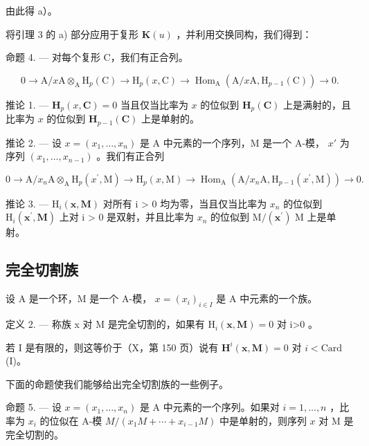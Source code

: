 由此得 a）。

将引理 3 的 a) 部分应用于复形 \(\mathbf{K}(u)\) ，并利用交换同构，我们得到：

命题 4. --- 对每个复形 C，我们有正合列。

\[
0 \rightarrow \mathrm{A} / x \mathrm{A} \otimes_ {\mathrm{A}} \mathrm{H} _ {p} (\mathrm{C}) \rightarrow \mathrm{H} _ {p} (x, \mathrm{C}) \rightarrow \operatorname{Hom} _ {\mathrm{A}} (\mathrm{A} / x \mathrm{A}, \mathrm{H} _ {p - 1} (\mathrm{C})) \rightarrow 0.
\]

推论 1. --- \(\mathbf{H}_{p}(x,\mathbf{C})=0\) 当且仅当比率为 \(x\) 的位似到 \(\mathbf{H}_{p}(\mathbf{C})\) 上是满射的，且比率为 \(x\) 的位似到 \(\mathbf{H}_{p-1}(\mathbf{C})\) 上是单射的。

推论 2. --- 设 \(x = (x_1, \ldots, x_n)\) 是 A 中元素的一个序列，M 是一个 A-模， \(x'\) 为序列 \((x_1, \ldots, x_{n-1})\) 。我们有正合列

\[
0 \rightarrow \mathrm{A} / x _ {n} \mathrm{A} \otimes_ {\mathrm{A}} \mathrm{H} _ {p} (x ^ {\prime}, \mathrm{M}) \rightarrow \mathrm{H} _ {p} (x, \mathrm{M}) \rightarrow \operatorname{Hom} _ {\mathrm{A}} (\mathrm{A} / x _ {n} \mathrm{A}, \mathrm{H} _ {p - 1} (x ^ {\prime}, \mathrm{M})) \rightarrow 0.
\]

推论 3. --- \(\mathrm{H}_{i}(\mathbf{x},\mathbf{M})\) 对所有 i \textgreater{} 0 均为零，当且仅当比率为 \(x_{n}\) 的位似到 \(\mathrm{H}_{i}(\mathbf{x}^{\prime},\mathbf{M})\) 上对 i \textgreater{} 0 是双射，并且比率为 \(x_{n}\) 的位似到 \(\mathrm{M}/(\mathbf{x}^{\prime})\) M 上是单射。

\subsection{完全切割族}

设 A 是一个环，M 是一个 A-模， \(x = (x_{i})_{i \in I}\) 是 A 中元素的一个族。

定义 2. --- 称族 x 对 M 是完全切割的，如果有 \(\mathrm{H}_{i}(\mathbf{x},\mathbf{M})=0\) 对 i\textgreater0 。

若 I 是有限的，则这等价于（X，第 150 页）说有 \(\mathbf{H}^i (\pmb {x},\mathbf{M}) = 0\) 对 \(i <   \mathrm{Card}\) (I)。

下面的命题使我们能够给出完全切割族的一些例子。

命题 5. --- 设 \(x = (x_1, \ldots, x_n)\) 是 A 中元素的一个序列。如果对 \(i=1, \ldots, n\) ，比率为 \(x_i\) 的位似在 A-模 \(M/(x_1 M + \cdots + x_{i-1} M)\) 中是单射的，则序列 \(x\) 对 M 是完全切割的。


